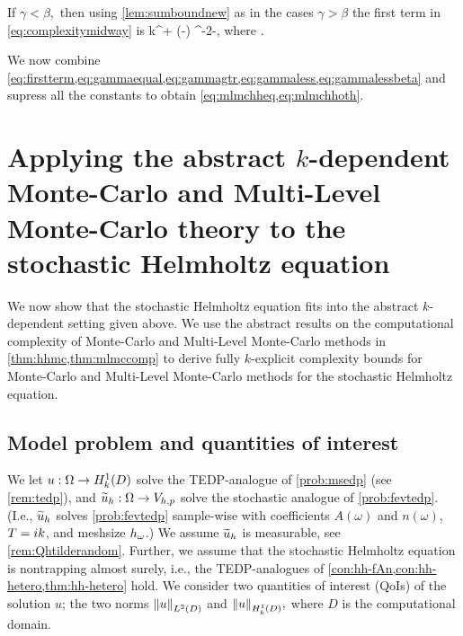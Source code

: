 If $\gamma < \beta,$ then using \cref{lem:sumboundnew} as in the cases $\gamma > \beta$ the first term in \eqref{eq:complexitymidway} is
\beq\label{eq:gammalessbeta}
\Cgammalessbeta k^{\tau + \mleft(\gamma-\beta\mright)\frac\sigma\alpha} \eps^{-2-\frac{\gamma-\beta}{\alpha}},
\eeq
where
\beq\label{eq:gammaless}
\Cgammalessbeta \de {}.
\eeq

We now combine \cref{eq:firstterm,eq:gammaequal,eq:gammagtr,eq:gammaless,eq:gammalessbeta} and supress all the constants to obtain \cref{eq:mlmchheq,eq:mlmchhoth}.
\epf



\section{Applying the abstract $k$-dependent Monte-Carlo and Multi-Level Monte-Carlo theory to the stochastic Helmholtz equation}\label{sec:mlmcapplying}

We now show that the stochastic Helmholtz equation fits into the abstract $k$-dependent setting given above. We use the abstract results on the computational complexity of Monte-Carlo and Multi-Level Monte-Carlo methods in \cref{thm:hhmc,thm:mlmccomp} to derive fully $k$-explicit complexity bounds for Monte-Carlo and Multi-Level Monte-Carlo methods for the stochastic Helmholtz equation.

\subsection{Model problem and quantities of interest}

We let $u:\Omega\rightarrow\HokD$ solve the TEDP-analogue of \cref{prob:msedp} (see \cref{rem:tedp}), and $\widetilde{u}_{h}:\Omega\rightarrow V_{h,p}$ solve the stochastic analogue of \cref{prob:fevtedp}. (I.e., $\widetilde{u}_{h}$ solves \cref{prob:fevtedp} sample-wise with coefficients $A(\omega)$ and $n(\omega)$, $T = ik$, and meshsize $h_{\omega}$.) We assume $\widetilde{u}_{h}$ is measurable, see \cref{rem:Qhtilderandom}. Further, we assume that the stochastic Helmholtz equation is nontrapping almost surely, i.e., the TEDP-analogues of \cref{con:hh-fAn,con:hh-hetero,thm:hh-hetero} hold. We consider two quantities of interest (QoIs) of the solution $u$; the two norms $\NLtD{u}$ and $\NHokD{u},$ where $D$ is the computational domain.

